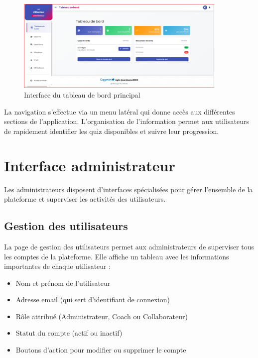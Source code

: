 \documentclass[12pt,a4paper]{report}
\begin{document}
\begin{figure}[H]
\centering
\includegraphics[width=0.9\textwidth]{latex_media/media/image52.png}
\caption{Interface du tableau de bord principal}
\label{fig:tableau-bord}
\end{figure}

La navigation s'effectue via un menu latéral qui donne accès aux différentes sections de l'application. L'organisation de l'information permet aux utilisateurs de rapidement identifier les quiz disponibles et suivre leur progression.

\section{Interface administrateur}

Les administrateurs disposent d'interfaces spécialisées pour gérer l'ensemble de la plateforme et superviser les activités des utilisateurs.

\subsection{Gestion des utilisateurs}

La page de gestion des utilisateurs permet aux administrateurs de superviser tous les comptes de la plateforme. Elle affiche un tableau avec les informations importantes de chaque utilisateur :

\begin{itemize}
    \item Nom et prénom de l'utilisateur
    \item Adresse email (qui sert d'identifiant de connexion)
    \item Rôle attribué (Administrateur, Coach ou Collaborateur)
    \item Statut du compte (actif ou inactif)
    \item Boutons d'action pour modifier ou supprimer le compte
\end{itemize}
\end{document}
